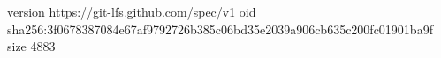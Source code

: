 version https://git-lfs.github.com/spec/v1
oid sha256:3f0678387084e67af9792726b385c06bd35e2039a906cb635c200fc01901ba9f
size 4883
